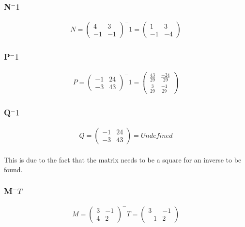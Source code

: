 \documentclass[a4paper,10pt]{article}
\begin{document}
        \subsubsection{N$^-1$}
            \begin{align*}
              N =
              \begin{pmatrix}
                4 &  3\\
               -1 & -1
              \end{pmatrix}
              ^-1
              =
              \begin{pmatrix}
                1 &  3\\
               -1 & -4
              \end{pmatrix}
            \end{align*}


        \subsubsection{P$^-1$}
          \begin{align*}
            P =
            \begin{pmatrix}
              -1 & 24\\
              -3 & 43
            \end{pmatrix}
            ^-1
             =
            \begin{pmatrix}
              \frac{43}{29} & \frac{-24}{29}\\
              \frac{ 3}{29} & \frac{ -1}{29}
            \end{pmatrix}
          \end{align*}

        \subsubsection{Q$^-1$}
          \begin{align*}
            Q =
            \begin{pmatrix}
              -1 & 24\\
              -3 & 43
            \end{pmatrix}
            = Undefined
          \end{align*}
          \\
          This is due to the fact that the matrix needs to be a square for an inverse to be found.

        \subsubsection{M$^-T$}
          \begin{align*}
            M =
            \begin{pmatrix}
              3 & -1\\
              4 &  2
            \end{pmatrix}
            ^-T
             =
            \begin{pmatrix}
               3 & -1\\
              -1 &  2
            \end{pmatrix}
          \end{align*}
\end{document}
